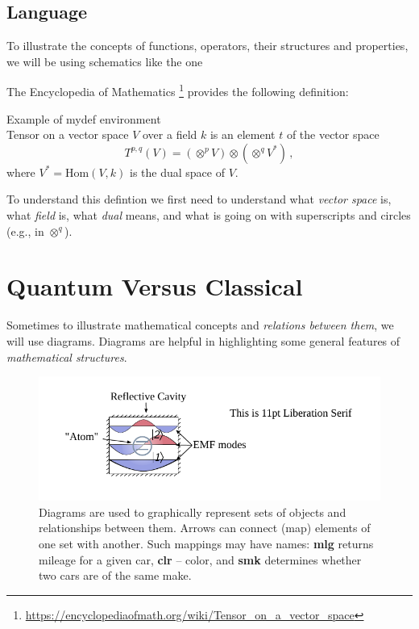 \subsection{Language}
To illustrate the concepts of functions, operators, their structures and
properties, we will be using schematics like the one

The Encyclopedia of Mathematics
\footnote{\url{https://encyclopediaofmath.org/wiki/Tensor_on_a_vector_space}}
provides the following definition:

\begin{mydef}{Example of mydef environment}\\
  \small
Tensor on a vector space $V$ over a field $k$ is an element $t$ of the
vector space
\begin{equation*}
	T^{p,q} (V) = (\otimes^p V)\otimes (\otimes^q V^*)\,,
\end{equation*}
where $V^*=\textrm{Hom}(V, k)$ is the dual space of $V$.
\label{tcb:tensorDefinition1}
\end{mydef}
To understand this defintion we first need to understand what
\emph{vector space} is, what \emph{field} is, what \emph{dual} means,
and what is going on with superscripts and circles (e.g., in
$\otimes^q$).


\section{Quantum Versus Classical}
Sometimes to illustrate mathematical concepts and \emph{relations between them},
we will use diagrams. Diagrams are helpful in highlighting
some general features of \emph{mathematical structures}.

\begin{figure}[htbp]
  \centering
  \includegraphics[scale=1.0]{defaultFigureTemplate}
  \caption{Diagrams are used to graphically represent sets of objects
    and relationships between them. Arrows can connect (map) elements
    of one set with another. Such mappings may have names: {\bf mlg}
    returns mileage for a given car, {\bf clr} -- color, and {\bf smk}
  determines whether two cars are of the same make.}
  \label{fig:diagrams}
\end{figure}

